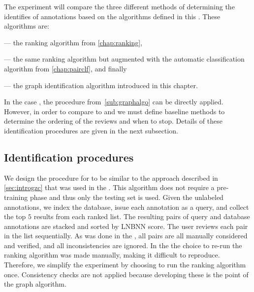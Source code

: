     The experiment will compare the three different methods of determining the identifies of annotations based on
      the algorithms defined in this \thesis{}.
    These algorithms are:
    \begin{enumin}

    \item {} --- the ranking algorithm from \cref{chap:ranking}, 

    \item {} --- the same
        ranking algorithm but augmented with the automatic classification algorithm from \cref{chap:pairclf}, and
        finally

    \item {} --- the graph identification algorithm introduced in this chapter.

    \end{enumin}
    In the case , the procedure from~\cref{sub:graphalgo} can be directly applied.
    However, in order to compare  to  and  we must define baseline
      methods to determine the ordering of the reviews and when to stop.
    Details of these identification procedures are given in the next subsection.

    \FloatBarrier{}
    \subsection{Identification procedures}

    We design the procedure for  to be similar to the approach described in \cref{sec:introgzc}
      that was used in the \GZC{}.
    This algorithm does not require a pre-training phase and thus only the testing set is used.
    Given the unlabeled annotations, we index the database, issue each annotation as a query, and collect the top
      $5$ results from each ranked list.
    The resulting pairs of query and database annotations are stacked and sorted by LNBNN score.
    The user reviews each pair in the list sequentially.
    As was done in the \GZC{}, all pairs are all manually considered and verified, and all inconsistencies are
      ignored.
    In the \GZC{} the choice to re-run the ranking algorithm was made manually, making it difficult to reproduce.
    Therefore, we simplify the experiment by choosing to run the ranking algorithm once.
    Consistency checks are not applied because developing these is the point of the graph algorithm.

